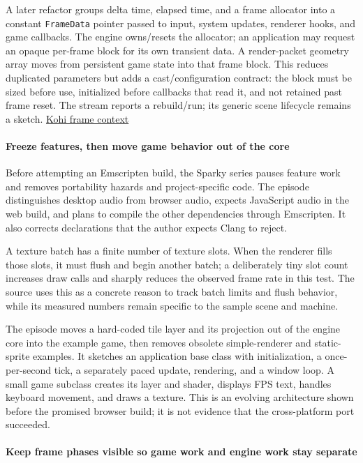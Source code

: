 A later refactor groups delta time, elapsed time, and a frame allocator into a constant \texttt{FrameData} pointer passed to input, system updates, renderer hooks, and game callbacks. The engine owns/resets the allocator; an application may request an opaque per-frame block for its own transient data. A render-packet geometry array moves from persistent game state into that frame block. This reduces duplicated parameters but adds a cast/configuration contract: the block must be sized before use, initialized before callbacks that read it, and not retained past frame reset. The stream reports a rebuild/run; its generic scene lifecycle remains a sketch. \href{https://www.youtube.com/watch?v=xRag4sy8Kyk}{Kohi frame context}

\paragraph{Freeze features, then move game behavior out of the core}\label{05-engine-i-ch013-freeze-features-then-move-game-behavior-out-of-the-core}

Before attempting an Emscripten build, the Sparky series pauses feature work and removes portability hazards and project-specific code. The episode distinguishes desktop audio from browser audio, expects JavaScript audio in the web build, and plans to compile the other dependencies through Emscripten. It also corrects declarations that the author expects Clang to reject.

A texture batch has a finite number of texture slots. When the renderer fills those slots, it must flush and begin another batch; a deliberately tiny slot count increases draw calls and sharply reduces the observed frame rate in this test. The source uses this as a concrete reason to track batch limits and flush behavior, while its measured numbers remain specific to the sample scene and machine.

The episode moves a hard-coded tile layer and its projection out of the engine core into the example game, then removes obsolete simple-renderer and static-sprite examples. It sketches an application base class with initialization, a once-per-second tick, a separately paced update, rendering, and a window loop. A small game subclass creates its layer and shader, displays FPS text, handles keyboard movement, and draws a texture. This is an evolving architecture shown before the promised browser build; it is not evidence that the cross-platform port succeeded.

\paragraph{Keep frame phases visible so game work and engine work stay separate}\label{05-engine-i-ch013-keep-frame-phases-visible-so-game-work-and-engine-work-stay-separate}

